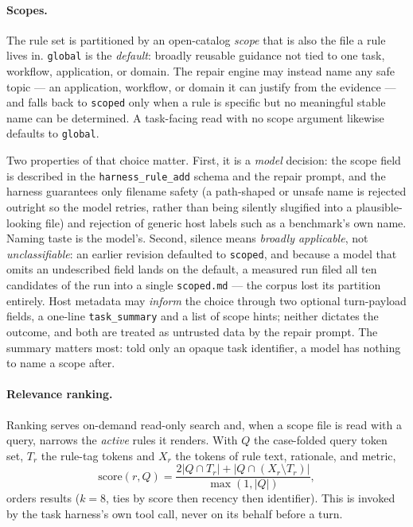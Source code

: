 \documentclass[11pt,letterpaper]{article}
\begin{document}
\paragraph{Scopes.}
The rule set is partitioned by an open-catalog \emph{scope} that is also the file a rule lives in.
\texttt{global} is the \emph{default}: broadly reusable guidance not tied to one task, workflow,
application, or domain. The repair engine may instead name any safe topic --- an application, workflow,
or domain it can justify from the evidence --- and falls back to \texttt{scoped} only when a rule is
specific but no meaningful stable name can be determined. A task-facing read with no scope argument
likewise defaults to \texttt{global}.

Two properties of that choice matter. First, it is a \emph{model} decision: the scope field is
described in the \texttt{harness\_rule\_add} schema and the repair prompt, and the harness guarantees
only filename safety (a path-shaped or unsafe name is rejected outright so the model retries, rather
than being silently slugified into a plausible-looking file) and rejection of generic host labels
such as a benchmark's own name. Naming taste is the model's. Second, silence means
\emph{broadly applicable}, not \emph{unclassifiable}: an earlier revision defaulted to
\texttt{scoped}, and because a model that omits an undescribed field lands on the default, a measured
run filed all ten candidates of the run into a single \texttt{scoped.md} --- the corpus lost its
partition entirely. Host metadata may \emph{inform} the choice through two optional turn-payload
fields, a one-line \texttt{task\_summary} and a list of scope hints; neither dictates the outcome,
and both are treated as untrusted data by the repair prompt. The summary matters most: told only an
opaque task identifier, a model has nothing to name a scope after.

\paragraph{Relevance ranking.}
Ranking serves on-demand read-only search and, when a scope file is read with a query, narrows the
\emph{active} rules it renders. With $Q$ the case-folded query token set, $T_r$ the
rule-tag tokens and $X_r$ the tokens of rule text, rationale, and metric,
\begin{equation}
 \mathrm{score}(r,Q)=\frac{2|Q\cap T_r|+|Q\cap(X_r\setminus T_r)|}{\max(1,|Q|)},
 \label{eq:score}
\end{equation}
orders results ($k{=}8$, ties by score then recency then identifier). This is invoked by the task harness's
own tool call, never on its behalf before a turn.
\end{document}
